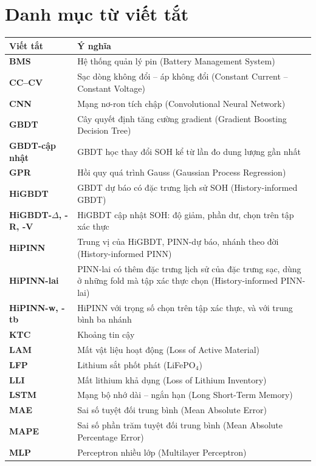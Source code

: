 \chapter*{Danh mục từ viết tắt}
{\small
\begin{longtable}{@{}>{\bfseries}l >{\raggedright\arraybackslash}p{}@{}}
\toprule
Viết tắt & Ý nghĩa \\
\midrule
\endhead
BMS & Hệ thống quản lý pin (Battery Management System)\\
CC--CV & Sạc dòng không đổi -- áp không đổi (Constant Current -- Constant Voltage)\\
CNN & Mạng nơ-ron tích chập (Convolutional Neural Network)\\
GBDT & Cây quyết định tăng cường gradient (Gradient Boosting Decision Tree)\\
GBDT-cập nhật & GBDT học thay đổi SOH kể từ lần đo dung lượng gần nhất\\
GPR & Hồi quy quá trình Gauss (Gaussian Process Regression)\\
HiGBDT & GBDT dự báo có đặc trưng lịch sử SOH (History-informed GBDT)\\
HiGBDT-$\Delta$, -R, -V & HiGBDT cập nhật SOH: độ giảm, phần dư, chọn trên tập xác thực\\
HiPINN & Trung vị của HiGBDT, PINN-dự báo, nhánh theo đời (History-informed PINN)\\
HiPINN-lai & PINN-lai có thêm đặc trưng lịch sử của đặc trưng sạc, dùng ở những fold mà tập xác thực chọn (History-informed PINN-lai)\\
HiPINN-w, -tb & HiPINN với trọng số chọn trên tập xác thực, và với trung bình ba nhánh\\
KTC & Khoảng tin cậy\\
LAM & Mất vật liệu hoạt động (Loss of Active Material)\\
LFP & Lithium sắt phốt phát (LiFePO$_4$)\\
LLI & Mất lithium khả dụng (Loss of Lithium Inventory)\\
LSTM & Mạng bộ nhớ dài -- ngắn hạn (Long Short-Term Memory)\\
MAE & Sai số tuyệt đối trung bình (Mean Absolute Error)\\
MAPE & Sai số phần trăm tuyệt đối trung bình (Mean Absolute Percentage Error)\\
MLP & Perceptron nhiều lớp (Multilayer Perceptron)\\

\end{longtable}}
